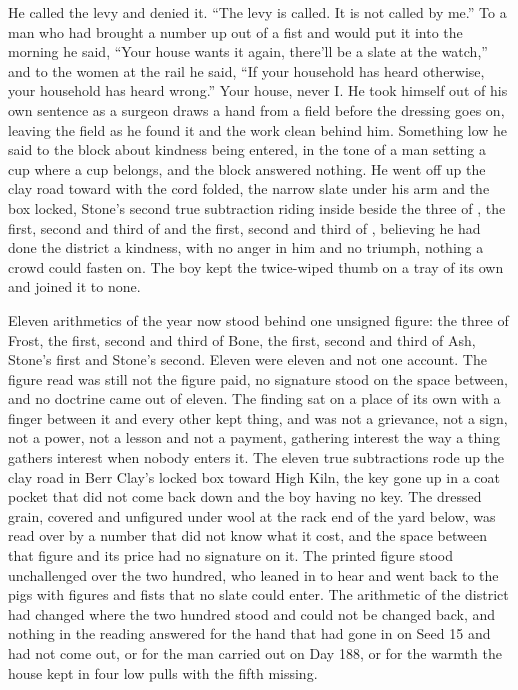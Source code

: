 He called the levy and denied it. “The levy is called. It is not called by me.” To a man who had brought a number up out of a fist and would put it into the morning he said, “Your house wants it again, there'll be a slate at the watch,” and to the women at the rail he said, “If your household has heard otherwise, your household has heard wrong.” Your house, never I. He took himself out of his own sentence as a surgeon draws a hand from a field before the dressing goes on, leaving the field as he found it and the work clean behind him. Something low he said to the block about kindness being entered, in the tone of a man setting a cup where a cup belongs, and the block answered nothing. He went off up the clay road toward  with the cord folded, the narrow slate under his arm and the box locked, Stone's second true subtraction riding inside beside the three of , the first, second and third of  and the first, second and third of , believing he had done the district a kindness, with no anger in him and no triumph, nothing a crowd could fasten on. The boy kept the twice-wiped thumb on a tray of its own and joined it to none.

\scenebreak

Eleven arithmetics of the year now stood behind one unsigned figure: the three of Frost, the first, second and third of Bone, the first, second and third of Ash, Stone's first and Stone's second. Eleven were eleven and not one account. The figure read was still not the figure paid, no signature stood on the space between, and no doctrine came out of eleven. The finding sat on a place of its own with a finger between it and every other kept thing, and was not a grievance, not a sign, not a power, not a lesson and not a payment, gathering interest the way a thing gathers interest when nobody enters it. The eleven true subtractions rode up the clay road in Berr Clay's locked box toward High Kiln, the key gone up in a coat pocket that did not come back down and the boy having no key. The dressed grain, covered and unfigured under wool at the rack end of the yard below, was read over by a number that did not know what it cost, and the space between that figure and its price had no signature on it. The printed figure stood unchallenged over the two hundred, who leaned in to hear and went back to the pigs with figures and fists that no slate could enter. The arithmetic of the district had changed where the two hundred stood and could not be changed back, and nothing in the reading answered for the hand that had gone in on Seed 15 and had not come out, or for the man carried out on Day 188, or for the warmth the house kept in four low pulls with the fifth missing.

